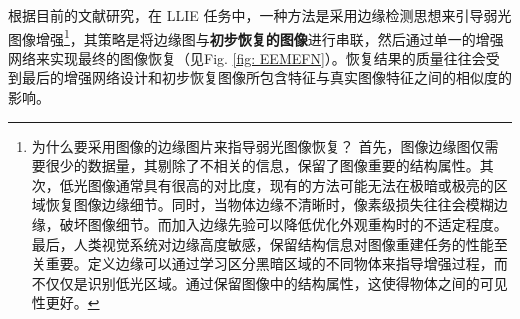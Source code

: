 \documentclass[a4paper, 10pt]{article}
\begin{document}
%		
%		
%		
%		
		
		根据目前的文献研究，在 LLIE 任务中，一种方法是采用边缘检测思想来引导弱光图像增强\footnote{为什么要采用图像的边缘图片来指导弱光图像恢复？
		首先，图像边缘图仅需要很少的数据量，其剔除了不相关的信息，保留了图像重要的结构属性。其次，低光图像通常具有很高的对比度，现有的方法可能无法在极暗或极亮的区域恢复图像边缘细节。同时，当物体边缘不清晰时，像素级损失往往会模糊边缘，破坏图像细节。而加入边缘先验可以降低优化外观重构时的不适定程度。最后，人类视觉系统对边缘高度敏感，保留结构信息对图像重建任务的性能至关重要。定义边缘可以通过学习区分黑暗区域的不同物体来指导增强过程，而不仅仅是识别低光区域。通过保留图像中的结构属性，这使得物体之间的可见性更好。}，其策略是将边缘图与\textbf{初步恢复的图像}进行串联，然后通过单一的增强网络来实现最终的图像恢复（见Fig. \ref{fig: EEMEFN}）。恢复结果的质量往往会受到最后的增强网络设计和初步恢复图像所包含特征与真实图像特征之间的相似度的影响。
		
\end{document}
